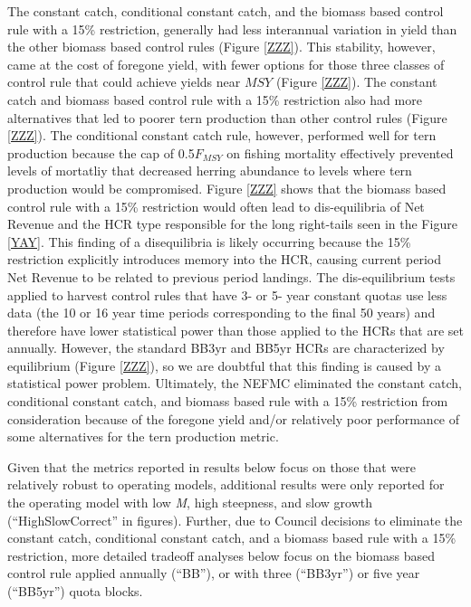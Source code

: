 \documentclass[]{article}
\begin{document}
The constant catch, conditional constant catch, and the biomass based
control rule with a 15\% restriction, generally had less interannual
variation in yield than the other biomass based control rules (Figure
\ref{ZZZ}). This stability, however, came at the cost of foregone yield,
with fewer options for those three classes of control rule that could
achieve yields near \(MSY\) (Figure \ref{ZZZ}). The constant catch and
biomass based control rule with a 15\% restriction also had more
alternatives that led to poorer tern production than other control rules
(Figure \ref{ZZZ}). The conditional constant catch rule, however,
performed well for tern production because the cap of 0.5\(F_{MSY}\) on
fishing mortality effectively prevented levels of mortatliy that
decreased herring abundance to levels where tern production would be
compromised. Figure \ref{ZZZ} shows that the biomass based control rule
with a 15\% restriction would often lead to dis-equilibria of Net
Revenue and the HCR type responsible for the long right-tails seen in
the Figure \ref{YAY}. This finding of a disequilibria is likely
occurring because the 15\% restriction explicitly introduces memory into
the HCR, causing current period Net Revenue to be related to previous
period landings. The dis-equilibrium tests applied to harvest control
rules that have 3- or 5- year constant quotas use less data (the 10 or
16 year time periods corresponding to the final 50 years) and therefore
have lower statistical power than those applied to the HCRs that are set
annually. However, the standard BB3yr and BB5yr HCRs are characterized
by equilibrium (Figure \ref{ZZZ}), so we are doubtful that this finding
is caused by a statistical power problem. Ultimately, the NEFMC
eliminated the constant catch, conditional constant catch, and biomass
based rule with a 15\% restriction from consideration because of the
foregone yield and/or relatively poor performance of some alternatives
for the tern production metric.

Given that the metrics reported in results below focus on those that
were relatively robust to operating models, additional results were only
reported for the operating model with low \emph{M}, high steepness, and
slow growth (``HighSlowCorrect'' in figures). Further, due to Council
decisions to eliminate the constant catch, conditional constant catch,
and a biomass based rule with a 15\% restriction, more detailed tradeoff
analyses below focus on the biomass based control rule applied annually
(``BB''), or with three (``BB3yr'') or five year (``BB5yr'') quota
blocks.
\end{document}
